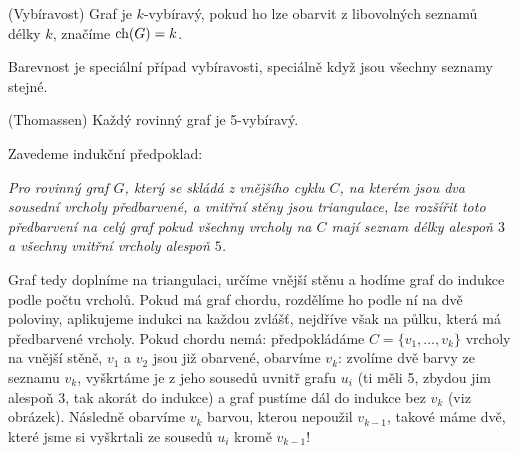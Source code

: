 \df (Vybíravost) Graf je $k$-vybíravý, pokud ho lze obarvit z libovolných
seznamů délky
$k$, značíme $\operatorname{ch}(G) = k$.

\poz Barevnost je speciální případ vybíravosti, speciálně když jsou všechny
seznamy stejné.

\vt (Thomassen) Každý rovinný graf je 5-vybíravý.

\dk Zavedeme indukční předpoklad: 

{\it Pro rovinný graf $G$, který se skládá z vnějšího cyklu $C$, na kterém jsou 
	dva sousední vrcholy předbarvené, a vnitřní stěny jsou triangulace, lze 
	rozšířit toto předbarvení na celý graf pokud všechny vrcholy na $C$ mají 
seznam délky alespoň $3$ a všechny vnitřní vrcholy alespoň $5$.}

Graf tedy doplníme na triangulaci, určíme vnější stěnu a hodíme graf do indukce 
podle počtu vrcholů. Pokud má graf chordu, rozdělíme ho podle ní na dvě 
poloviny, aplikujeme indukci na každou zvlášť, nejdříve však na půlku, která má 
předbarvené vrcholy. Pokud chordu nemá: předpokládáme $C=\{v_1, \dots, v_k\}$ 
vrcholy na vnější stěně, $v_1$ a $v_2$ jsou již obarvené, obarvíme $v_k$: 
zvolíme dvě barvy ze seznamu $v_k$, vyškrtáme
je z jeho sousedů uvnitř grafu $u_i$ (ti měli 5, zbydou jim alespoň 3, tak 
akorát do indukce) a graf pustíme dál do indukce bez $v_k$ (viz obrázek).  
Následně obarvíme $v_k$ barvou, kterou nepoužil $v_{k-1}$, takové máme dvě, 
které jsme si vyškrtali ze sousedů $u_i$ kromě $v_{k-1}$!

